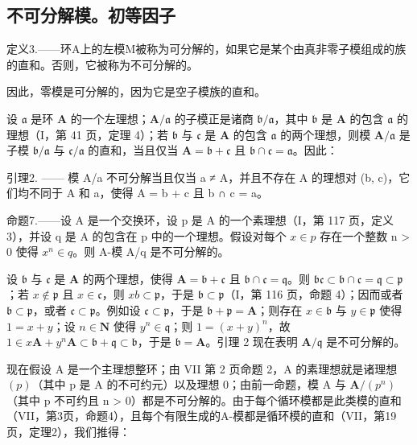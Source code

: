 \subsection{不可分解模。初等因子}

定义3.——环A上的左模M被称为可分解的，如果它是某个由真非零子模组成的族的直和。否则，它被称为不可分解的。

因此，零模是可分解的，因为它是空子模族的直和。

设 \(\mathfrak{a}\) 是环 \(\mathbf{A}\) 的一个左理想；\(\mathbf{A} / \mathfrak{a}\) 的子模正是诸商 \(\mathfrak{b} / \mathfrak{a}\)，其中 \(\mathfrak{b}\) 是 \(\mathbf{A}\) 的包含 \(\mathfrak{a}\) 的理想（I，第 41 页，定理 4）；若 \(\mathfrak{b}\) 与 \(\mathfrak{c}\) 是 \(\mathbf{A}\) 的包含 \(\mathfrak{a}\) 的两个理想，则模 \(\mathbf{A} / \mathfrak{a}\) 是子模 \(\mathfrak{b} / \mathfrak{a}\) 与 \(\mathfrak{c} / \mathfrak{a}\) 的直和，当且仅当 \(\mathbf{A} = \mathfrak{b} + \mathfrak{c}\) 且 \(\mathfrak{b} \cap \mathfrak{c} = \mathfrak{a}\)。因此：

引理2. —— 模 A/a 不可分解当且仅当 a ≠ A，并且不存在 A 的理想对 (b, c)，它们均不同于 A 和 a，使得 A = b + c 且 b ∩ c = a。

命题7.——设 A 是一个交换环，设 p 是 A 的一个素理想（I，第 117 页，定义 3），并设 q 是 A 的包含在 p 中的一个理想。假设对每个 \(x \in p\) 存在一个整数 n \textgreater{} 0 使得 \(x^{n} \in q\)。则 A-模 A/q 是不可分解的。

设 \(\mathfrak{b}\) 与 \(\mathfrak{c}\) 是 \(\mathbf{A}\) 的两个理想，使得 \(\mathbf{A} = \mathfrak{b} + \mathfrak{c}\) 且 \(\mathfrak{b} \cap \mathfrak{c} = \mathfrak{q}\)。则 \(\mathfrak{bc} \subset \mathfrak{b} \cap \mathfrak{c} = \mathfrak{q} \subset \mathfrak{p}\)；若 \(x \notin \mathfrak{p}\) 且 \(x \in \mathfrak{c}\)，则 \(xb \subset \mathfrak{p}\)，于是 \(\mathfrak{b} \subset \mathfrak{p}\)（I，第 116 页，命题 4）；因而或者 \(\mathfrak{b} \subset \mathfrak{p}\)，或者 \(\mathfrak{c} \subset \mathfrak{p}\)。例如设 \(\mathfrak{c} \subset \mathfrak{p}\)，于是 \(\mathfrak{b} + \mathfrak{p} = \mathbf{A}\)；则存在 \(x \in \mathfrak{b}\) 与 \(y \in \mathfrak{p}\) 使得 \(1 = x + y\)；设 \(n \in \mathbf{N}\) 使得 \(y^n \in \mathfrak{q}\)；则 \(1 = (x + y)^n\)，故 \(1 \in x\mathbf{A} + y^n\mathbf{A} \subset \mathfrak{b} + \mathfrak{q} \subset \mathfrak{b}\)，于是 \(\mathfrak{b} = \mathbf{A}\)。引理 2 现在表明 \(\mathbf{A}/\mathfrak{q}\) 是不可分解的。

现在假设 A 是一个主理想整环；由 VII 第 2 页命题 2，A 的素理想就是诸理想 \((p)\)（其中 p 是 A 的不可约元）以及理想 0；由前一命题，模 A 与 \(\mathbf{A}/(p^{n})\)（其中 p 不可约且 n \textgreater{} 0）都是不可分解的。由于每个循环模都是此类模的直和（VII，第3页，命题4），且每个有限生成的A-模都是循环模的直和（VII，第19页，定理2），我们推得：

